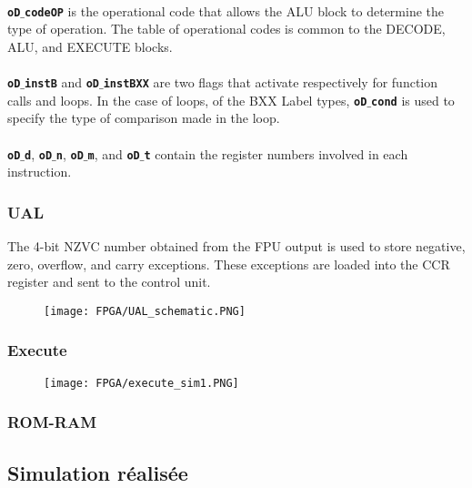 \documentclass{article}
\begin{document}
\paragraph{}\textbf{\texttt{oD$\_$codeOP}} is the operational code that allows the ALU block to determine the type of operation. The table of operational codes is common to the DECODE, ALU, and EXECUTE blocks.

\paragraph{}\textbf{\texttt{oD$\_$instB}} and \textbf{\texttt{oD$\_$instBXX}} are two flags that activate respectively for function calls and loops. In the case of loops, of the BXX Label types, \textbf{\texttt{oD$\_$cond}} is used to specify the type of comparison made in the loop.

\paragraph{}\textbf{\texttt{oD$\_$d}}, \textbf{\texttt{oD$\_$n}}, \textbf{\texttt{oD$\_$m}}, and \textbf{\texttt{oD$\_$t}} contain the register numbers involved in each instruction.


\subsubsection{UAL}
The 4-bit NZVC number obtained from the FPU output is used to store negative, zero, overflow, and carry exceptions. These exceptions are loaded into the CCR register and sent to the control unit.
\begin{figure}[H]
    \centering
    \texttt{[image: FPGA/UAL\_schematic.PNG]}
\end{figure}

\subsubsection{Execute}


\begin{figure}[H]
    \centering
    \texttt{[image: FPGA/execute\_sim1.PNG]}
\end{figure}


\subsubsection{ROM-RAM}

\subsection{Simulation réalisée}
\end{document}
